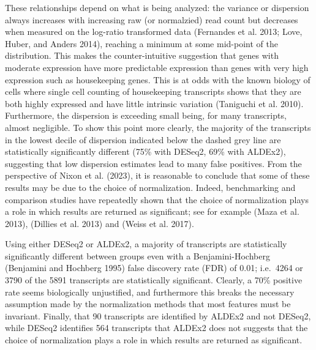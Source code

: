 \documentclass[
]{article}
\begin{document}
These relationships depend on what is being analyzed: the variance or
dispersion always increases with increasing raw (or normalzied) read
count but decreases when measured on the log-ratio transformed data
(Fernandes et al. 2013; Love, Huber, and Anders 2014), reaching a
minimum at some mid-point of the distribution. This makes the
counter-intuitive suggestion that genes with moderate expression have
more predictable expression than genes with very high expression such as
housekeeping genes. This is at odds with the known biology of cells
where single cell counting of housekeeping transcripts shows that they
are both highly expressed and have little intrinsic variation (Taniguchi
et al. 2010). Furthermore, the dispersion is exceeding small being, for
many transcripts, almost negligible. To show this point more clearly,
the majority of the transcripts in the lowest decile of dispersion
indicated below the dashed grey line are statistically significantly
different (75\% with DESeq2, 69\% with ALDEx2), suggesting that low
dispersion estimates lead to many false positives. From the perspective
of Nixon et al. (2023), it is reasonable to conclude that some of these
results may be due to the choice of normalization. Indeed, benchmarking
and comparison studies have repeatedly shown that the choice of
normalization plays a role in which results are returned as significant;
see for example (Maza et al. 2013), (Dillies et al. 2013) and (Weiss et
al. 2017).

Using either DESeq2 or ALDEx2, a majority of transcripts are
statistically significantly different between groups even with a
Benjamini-Hochberg (Benjamini and Hochberg 1995) false discovery rate
(FDR) of 0.01; i.e.~4264 or 3790 of the 5891 transcripts are
statistically significant. Clearly, a 70\% positive rate seems
biologically unjustified, and furthermore this breaks the necessary
assumption made by the normalization methods that most features must be
invariant. Finally, that 90 transcripts are identified by ALDEx2 and not
DESeq2, while DESeq2 identifies 564 transcripts that ALDEx2 does not
suggests that the choice of normalization plays a role in which results
are returned as significant.
\end{document}
